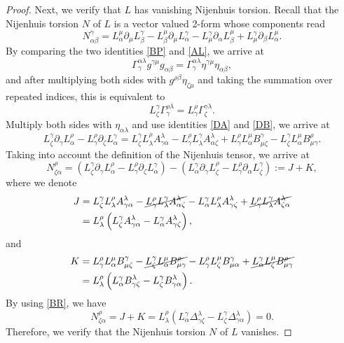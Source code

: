 \documentclass[11pt,a4paper]{amsart}
\numberwithin{equation}{section}
\newcommand{\qa}{\alpha}
\newcommand{\qb}{\beta}
\newcommand{\qg}{\gamma}
\newcommand{\qz}{\zeta}
\newcommand{\qp}{\partial}
\newcommand{\Qg}{\Gamma}
\newcommand{\ql}{\lambda}
\newcommand{\Qd}{\Delta}
\newcommand{\kk}[1]{\left(#1\right)}
\numberwithin{equation}{section}
\begin{document}
\begin{proof}
Next, we verify that $L$ has vanishing Nijenhuis torsion. Recall that the Nijenhuis torsion $N$ of $L$ is a vector valued 2-form whose components read 
\[
N^\qg_{\qa\qb} = L^\mu_\qa\qp_\mu L^\qg_\qb-L^\mu_\qb\qp_\mu L^\qg_\qa-L^\qg_\mu\qp_\qa L^\mu_\qb+L^\qg_\mu\qp_\qb L^\mu_\qa.
\]
By comparing the two identities \eqref{BP} and \eqref{AL}, we arrive at 
\[
\Qg^{\qa\ql}_\qg g^{\qg\mu}g_{\qa\qb} = \Qg^{\qa\ql}_\qg \eta^{\qg\mu}\eta_{\qa\qb},
\]
and after multiplying both sides with $g^{\rho\qb}\eta_{\qz\mu}$ and taking the summation over repeated indices, this is equivalent to 
\[
L^\qg_\qz \Qg^{\rho\ql}_\qg = L^\rho_\qg\Qg^{\qg\ql}_\qz.
\]
Multiply both sides with $\eta_{\qa\ql}$ and use identities \eqref{DA} and \eqref{DB}, we arrive at 
\begin{equation*}
  \label{BS}
L^\qg_\qz\qp_\qg L^\rho_\qa-L^\rho_\qg\qp_\qz L^\qg_\qa = L^\qg_\qz L^\rho_\ql A^\ql_{\qg\qa}-L^\rho_\qg L^\qg_\ql A^\ql_{\qa\qz}+L^\rho_\qg L^\mu_\qa B^\qg_{\mu\qz}-L^\qg_\qz L^\mu_\qa B^\rho_{\mu\qg}.
\end{equation*}
Taking into account the definition of the Nijenhuis tensor, we arrive at 
\[
N^\rho_{\qz\qa} = \kk{L^\qg_\qz\qp_\qg L^\rho_\qa-L^\rho_\qg\qp_\qz L^\qg_\qa}-\kk{L^\qg_\qa\qp_\qg L^\rho_\qz-L^\rho_\qg\qp_\qa L^\qg_\qz}:=J+K,
\]
where we denote 
\begin{align*}
  J &= L^\qg_\qz L^\rho_\ql A^\ql_{\qg\qa}-\cancel{L^\rho_\qg L^\qg_\ql A^\ql_{\qa\qz}}-L^\qg_\qa L^\rho_\ql A^\ql_{\qg\qz}+\cancel{L^\rho_\qg L^\qg_\ql A^\ql_{\qz\qa}}\\
  &=L^\rho_\ql\kk{L^\qg_\qz  A^\ql_{\qg\qa}-L^\qg_\qa  A^\ql_{\qg\qz}},
\end{align*}
and 
\begin{align*}
  K&=L^\rho_\qg L^\mu_\qa B^\qg_{\mu\qz}-\cancel{L^\qg_\qz L^\mu_\qa B^\rho_{\mu\qg}}-L^\rho_\qg L^\mu_\qz B^\qg_{\mu\qa}+\cancel{L^\qg_\qa L^\mu_\qz B^\rho_{\mu\qg}}\\
  &=L^\rho_\ql \kk{L^\qg_\qa B^\ql_{\qg\qz}- L^\qg_\qz B^\ql_{\qg\qa}}.
\end{align*}
By using \eqref{BR}, we have 
\[
N^\rho_{\qz\qa} = J+K = L^\rho_\ql\kk{L^\qg_\qa \Qd^\ql_{\qg\qz}-L^\qg_\qz\Qd^\ql_{\qg\qa}} = 0.
\]
Therefore, we verify that the Nijenhuis torsion $N$ of $L$ vanishes.


\end{proof}
\end{document}
